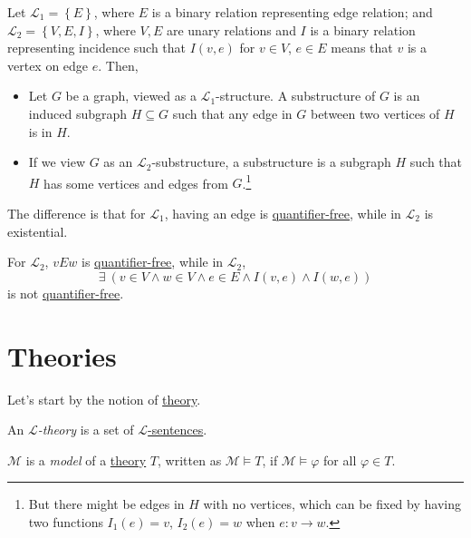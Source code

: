 \begin{eg}
	Let \(\mathcal{L} _1 = \left\{ E \right\} \), where \(E\) is a binary relation representing edge relation; and \(\mathcal{L} _2 = \left\{ V, E, I \right\} \), where \(V, E\) are unary relations and \(I\) is a binary relation representing incidence such that \(I(v, e)\) for \(v\in V\), \(e\in E\) means that \(v\) is a vertex on edge \(e\). Then,
	\begin{itemize}
		\item Let \(G\) be a graph, viewed as a \(\mathcal{L} _1\)-structure. A substructure of \(G\) is an induced subgraph \(H \subseteq G\) such that any edge in \(G\) between two vertices of \(H\) is in \(H\).
		\item If we view \(G\) as an \(\mathcal{L} _2\)-substructure, a substructure is a subgraph \(H\) such that \(H\) has some vertices and edges from \(G\).\footnote{But there might be edges in \(H\) with no vertices, which can be fixed by having two functions \(I_1(e)=v\), \(I_2(e)=w\) when \(e\colon v \to w\).}
	\end{itemize}
\end{eg}

\begin{remark}
	The difference is that for \(\mathcal{L} _1\), having an edge is \hyperref[not:quantifier-free-formula]{quantifier-free}, while in \(\mathcal{L} _2\) is existential.
\end{remark}
\begin{explanation}
	For \(\mathcal{L} _2\), \(vEw\) is \hyperref[not:quantifier-free-formula]{quantifier-free}, while in \(\mathcal{L} _2\),
	\[
		\exists \ (v\in V \land w\in V \land e\in E \land I(v, e) \land I(w, e))
	\]
	is not \hyperref[not:quantifier-free-formula]{quantifier-free}.
\end{explanation}

\section{Theories}
Let's start by the notion of \hyperref[def:theory]{theory}.

\begin{definition}[Theory]\label{def:theory}
	An \emph{\(\mathcal{L}\)-theory} is a set of \hyperref[def:sentence]{\(\mathcal{L} \)-sentences}.
\end{definition}

\begin{definition}[Model]\label{def:model}
	\(\mathcal{M} \) is a \emph{model} of a \hyperref[def:theory]{theory} \(T\), written as \(\mathcal{M} \models T\), if \(\mathcal{M} \models \varphi \) for all \(\varphi \in T\).
\end{definition}

